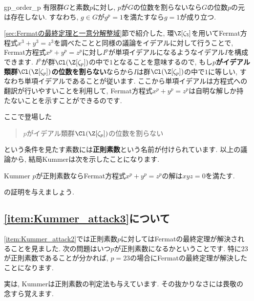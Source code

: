 \documentclass[11pt,b5paper,oneside,titlepage,lualatex]{ltjsreport}
\begin{document}
\begin{lem}{}{gp_order_p}
	有限群$ G $と素数$ p $に対し, $ p $が$ G $の位数を割らないなら$ G $の位数$ p $の元は存在しない. 
	すなわち, $ g \in G $が$ g^p = 1 $を満たすなら$ g = 1 $が成り立つ. 
\end{lem}

\ref{sec:Fermatの最終定理と一意分解整域}節で紹介した, 環$ \Z[\zeta_3] $を用いてFermat方程式$ x^3 + y^3 = z^3 $を調べたことと同様の議論をイデアルに対して行うことで, Fermat方程式$ x^p + y^p = z^p $に対し$ I^p $が単項イデアルになるようなイデアル$ I $を構成できます. 
$ I^p $が群$ \Cl(\Z[\zeta_p]) $の中で$ 1 $となることを意味するので, もし\textbf{$ p $がイデアル類群$ \Cl(\Z[\zeta_p]) $の位数を割らない}ならから$ I $は群$ \Cl(\Z[\zeta_p]) $の中で$ 1 $に等しい, すなわち単項イデアルであることが従います. 
ここから単項イデアルは方程式への翻訳が行いやすいことを利用して, Fermat方程式$ x^p + y^p = z^p $は自明な解しか持たないことを示すことができるのです. 

ここで登場した
\begin{quote}
	\centering
	$ p $がイデアル類群$ \Cl(\Z[\zeta_p]) $の位数を割らない
\end{quote}
という条件を見たす素数には\textbf{正則素数}という名前が付けられています. 
以上の議論から, 結局Kummerは次を示したことになります. 

\begin{thm}{Kummer}{}
	$ p $が正則素数ならFermat方程式$ x^p + y^p = z^p $の解は$ xyz = 0 $を満たす. 
\end{thm}


\begin{exc}{}{}
	の証明を与えましょう. 
\end{exc}


\subsection{\ref{item:Kummer_attack3}について}


\ref{item:Kummer_attack2}では正則素数$ p $に対してはFermatの最終定理が解決されることを見ました. 
次の問題はいつ$ p $が正則素数になるかということです. 
特に$ 23 $が正則素数であることが分かれば, $ p=23 $の場合にFermatの最終定理が解決したことになります. 

実は, Kummerは正則素数の判定法も与えています. 
その抜かりなさには畏敬の念すら覚えます. 
\end{document}
